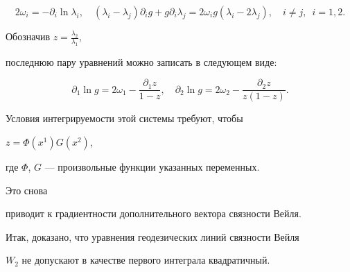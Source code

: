 $$ 


2\omega_i=-\partial_i\ln\lambda_i,\quad 


(\lambda_i-\lambda_j)\partial_i g+g\partial_i\lambda_j= 


2\omega_i g(\lambda_i-2\lambda_j),\quad 


i\ne j,\ \; i=1,2. 


$$ 


Обозначив $z=\frac{\lambda_2}{\lambda_1}$, 


последнюю пару уравнений можно записать в следующем виде:


$$ 


\partial_1\ln g=2\omega_1-\frac{\partial_1z}{1-z},\quad 


\partial_2\ln g=2\omega_2-\frac{\partial_2z}{z(1-z)}.


$$ 


Условия интегрируемости этой системы требуют, чтобы 


$z=\Phi(x^1)G(x^2)$,


где $\Phi$, $G$ --- произвольные функции указанных переменных.


Это снова  


приводит к градиентности дополнительного вектора связности Вейля.


 


Итак, доказано, что уравнения геодезических линий связности Вейля  


$W_2$ не допускают в качестве первого интеграла квадратичный.


 


